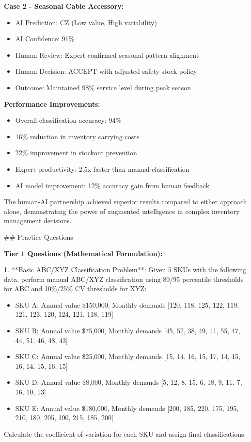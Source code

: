 \documentclass{article}
\begin{document}
\textbf{Case 2 - Seasonal Cable Accessory:}
\begin{itemize}
    \item AI Prediction: CZ (Low value, High variability)
    \item AI Confidence: 91\%
    \item Human Review: Expert confirmed seasonal pattern alignment
    \item Human Decision: ACCEPT with adjusted safety stock policy
    \item Outcome: Maintained 98\% service level during peak season
\end{itemize}

\textbf{Performance Improvements:}
\begin{itemize}
    \item Overall classification accuracy: 94\%
    \item 16\% reduction in inventory carrying costs
    \item 22\% improvement in stockout prevention
    \item Expert productivity: 2.5x faster than manual classification
    \item AI model improvement: 12\% accuracy gain from human feedback
\end{itemize}

The human-AI partnership achieved superior results compared to either approach alone, demonstrating the power of augmented intelligence in complex inventory management decisions.

## Practice Questions

\textbf{Tier 1 Questions (Mathematical Formulation):}

1. **Basic ABC/XYZ Classification Problem**: Given 5 SKUs with the following data, perform manual ABC/XYZ classification using 80/95 percentile thresholds for ABC and 10\%/25\% CV thresholds for XYZ:
   \begin{itemize}
       \item SKU A: Annual value \$150,000, Monthly demands [120, 118, 125, 122, 119, 121, 123, 120, 124, 121, 118, 119]
       \item SKU B: Annual value \$75,000, Monthly demands [45, 52, 38, 49, 41, 55, 47, 44, 51, 46, 48, 43]
       \item SKU C: Annual value \$25,000, Monthly demands [15, 14, 16, 15, 17, 14, 15, 16, 14, 15, 16, 15]
       \item SKU D: Annual value \$8,000, Monthly demands [5, 12, 8, 15, 6, 18, 9, 11, 7, 16, 10, 13]
       \item SKU E: Annual value \$180,000, Monthly demands [200, 185, 220, 175, 195, 210, 180, 205, 190, 215, 185, 200]
   \end{itemize}
   Calculate the coefficient of variation for each SKU and assign final classifications.
\end{document}

